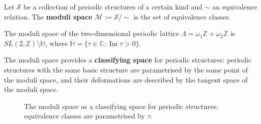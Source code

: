 \begin{definition}\label{def:moduli_space}
Let $\mathcal{S}$ be a collection of periodic structures of a certain kind and $\sim$ an equivalence relation. The \textbf{moduli space} $\mathcal{M} := \mathcal{S}/\sim$ is the set of equivalence classes.
\end{definition}

\begin{example}\label{ex:lattice_moduli_space}
The moduli space of the two-dimensional periodic lattice $\Lambda = \omega_1\mathbb{Z} + \omega_2\mathbb{Z}$ is $SL(2,\mathbb{Z}) \setminus \mathbb{H}$, where $\mathbb{H} = \{\tau \in \mathbb{C} : \operatorname{Im}\tau > 0\}$.
\end{example}

\begin{remark}\label{rem:moduli_space_role}
The moduli space provides a \textbf{classifying space} for periodic structures: periodic structures with the same basic structure are parametrised by the same point of the moduli space, and their deformations are described by the tangent space of the moduli space.
\end{remark}

\begin{figure}[htbp]
\centering
{}
\caption{The moduli space as a classifying space for periodic structures: equivalence classes are parametrised by $\tau$.}
\label{fig:moduli_space}
\end{figure}

